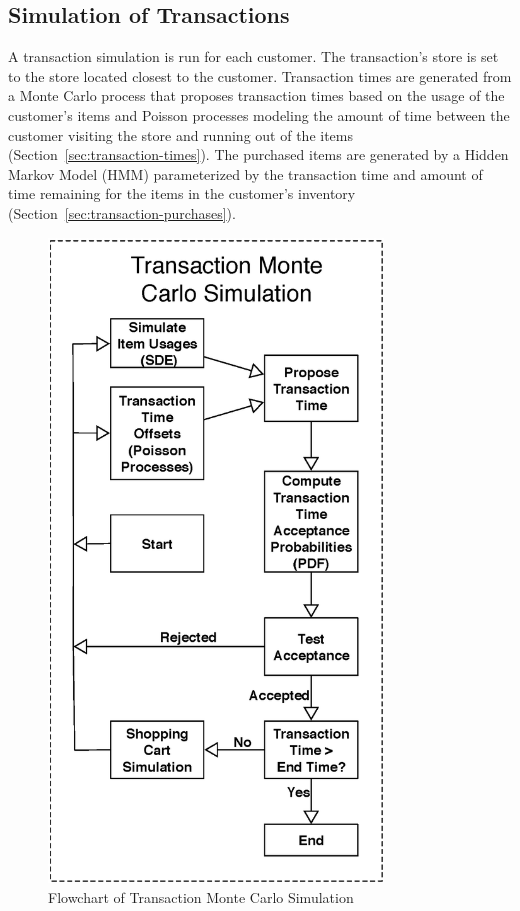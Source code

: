 \documentclass[conference]{IEEEtran}
\begin{document}
\subsection{Simulation of Transactions}
A transaction simulation is run for each customer. The transaction's store is set to the store located closest to the customer.  Transaction times are generated from a Monte Carlo process that proposes transaction times based on the usage of the customer's items and Poisson processes modeling the amount of time between the customer visiting the store and running out of the items (Section~\ref{sec:transaction-times}).  The purchased items are generated by a Hidden Markov Model (HMM) parameterized by the transaction time and amount of time remaining for the items in the customer's inventory (Section~\ref{sec:transaction-purchases}).

\begin{figure}[!t]
  \centering
  \includegraphics[width=3.5in]{figures/transaction_simulation.eps}
  \caption{Flowchart of Transaction Monte Carlo Simulation}
  \label{fig:trans_sim}
\end{figure}
\end{document}
